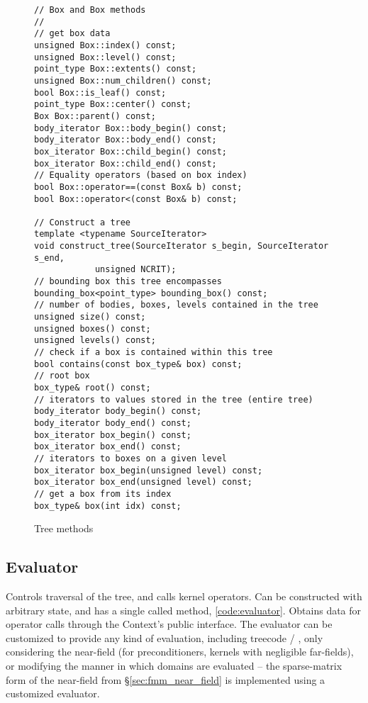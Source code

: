 \begin{figure*}[h]

\begin{lstlisting}
// Box and Box methods
//
// get box data
unsigned Box::index() const;
unsigned Box::level() const;
point_type Box::extents() const;
unsigned Box::num_children() const;
bool Box::is_leaf() const;
point_type Box::center() const;
Box Box::parent() const;
body_iterator Box::body_begin() const;
body_iterator Box::body_end() const;
box_iterator Box::child_begin() const;
box_iterator Box::child_end() const;
// Equality operators (based on box index)
bool Box::operator==(const Box& b) const;
bool Box::operator<(const Box& b) const;

// Construct a tree
template <typename SourceIterator>
void construct_tree(SourceIterator s_begin, SourceIterator s_end,
		    unsigned NCRIT);
// bounding box this tree encompasses
bounding_box<point_type> bounding_box() const;
// number of bodies, boxes, levels contained in the tree
unsigned size() const;
unsigned boxes() const;
unsigned levels() const;
// check if a box is contained within this tree
bool contains(const box_type& box) const;
// root box
box_type& root() const;
// iterators to values stored in the tree (entire tree)
body_iterator body_begin() const;
body_iterator body_end() const;
box_iterator box_begin() const;
box_iterator box_end() const;
// iterators to boxes on a given level
box_iterator box_begin(unsigned level) const;
box_iterator box_end(unsigned level) const;
// get a box from its index
box_type& box(int idx) const;
\end{lstlisting}
\caption{Tree methods}
\label{code:tree}
\end{figure*}

\subsection{Evaluator}\label{subsec:evaluator}

Controls traversal of the tree, and calls kernel operators. Can be constructed with arbitrary state, and has a single called method, \ref{code:evaluator}. Obtains data for operator calls through the Context's public interface. The evaluator can be customized to provide any kind of evaluation, including treecode / {\fmm}, only considering the near-field (for preconditioners, kernels with negligible far-fields), or modifying the manner in which domains are evaluated -- the sparse-matrix form of the near-field from \S\ref{sec:fmm_near_field} is implemented using a customized evaluator.

